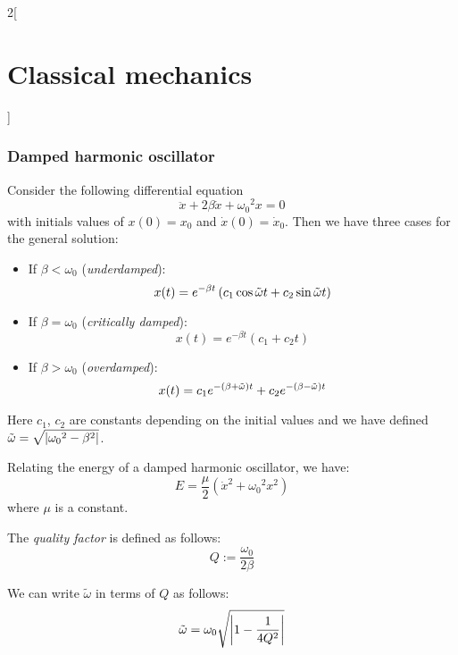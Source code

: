 \documentclass[../../../main_physics.tex]{subfiles}
\begin{document}
\begin{multicols}{2}[\section{Classical mechanics}]
  \subsubsection{Damped harmonic oscillator}
  \begin{proposition}
    Consider the following differential equation $$\ddot{x}+2\beta\dot{x}+{\omega_0}^2 x=0$$ with initials values of $x(0)=x_0$ and $\dot{x}(0)=\dot{x}_0$. Then we have three cases for the general solution:
    \begin{itemize}
      \item If $\beta<\omega_0$ (\emph{underdamped}):
            \begin{equation}
              x(t)=e^{-\beta t}\left(c_1\cos\Tilde{\omega}t+c_2\sin\Tilde{\omega}t\right)
              \label{CM_b<w}
            \end{equation}
      \item If $\beta=\omega_0$ (\emph{critically damped}):
            \begin{equation}
              x(t)=e^{-\beta t}\left(c_1+c_2t\right)
              \label{CM_b=w}
            \end{equation}
      \item If $\beta>\omega_0$ (\emph{overdamped}):
            \begin{equation}
              x(t)=c_1e^{-(\beta+\Tilde{\omega})t}+c_2e^{-(\beta-\Tilde{\omega})t}
              \label{CM_b>w}
            \end{equation}
    \end{itemize}
    Here $c_1$, $c_2$ are constants depending on the initial values and we have defined $\displaystyle \Tilde{\omega}=\sqrt{\left|{\omega_0}^2-\beta^2\right|}$.
  \end{proposition}
  \begin{proposition}
    Relating the energy of a damped harmonic oscillator, we have:
    $$E=\frac{\mu}{2}\left(\dot{x}^2+{\omega_0}^2x^2\right)$$ where $\mu$ is a constant.
  \end{proposition}
  \begin{definition}
    The \emph{quality factor} is defined as follows: $$Q:=\frac{\omega_0}{2\beta}$$
  \end{definition}
  \begin{proposition}
    We can write $\tilde{\omega}$ in terms of $Q$ as follows: $$\Tilde{\omega}=\omega_0\sqrt{\left|1-\frac{1}{4Q^2}\right|}$$
  \end{proposition}

\end{multicols}
\end{document}

